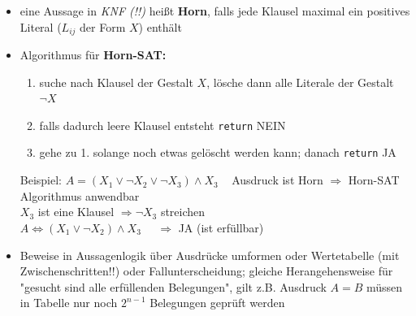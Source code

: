 \documentclass[10pt,a4paper]{article}
\begin{document}
\begin{itemize}
\item eine Aussage in \textit{KNF (!!)} heißt \textbf{Horn}, falls jede Klausel maximal ein positives Literal ($L_{ij}$ der Form $X$) enthält
\item Algorithmus für \textbf{Horn-SAT:} 
\begin{enumerate}
\item suche nach Klausel der Gestalt $X$, lösche dann alle Literale der Gestalt $\lnot X$
\item falls dadurch leere Klausel entsteht \texttt{return} NEIN
\item gehe zu 1. solange noch etwas gelöscht werden kann; danach \texttt{return} JA 
\end{enumerate}
Beispiel: $A=(X_{1}\lor \lnot X_{2}\lor \lnot X_{3})\land X_{3}\;\;\;$ Ausdruck ist Horn $\Rightarrow$ Horn-SAT Algorithmus anwendbar\\
$X_{3}$ ist eine Klausel $\Rightarrow \lnot X_{3}$ streichen \\
$A\Leftrightarrow (X_{1}\lor \lnot X_{2})\land X_{3}\;\;\;\;\; \Rightarrow$ JA (ist erfüllbar)
\item Beweise in Aussagenlogik über Ausdrücke umformen oder Wertetabelle (mit Zwischenschritten!!) oder Fallunterscheidung; gleiche Herangehensweise für "gesucht sind alle erfüllenden Belegungen", gilt z.B. Ausdruck $A=B$ müssen in Tabelle nur noch $2^{n-1}$ Belegungen geprüft werden
\end{itemize}
\end{document}
